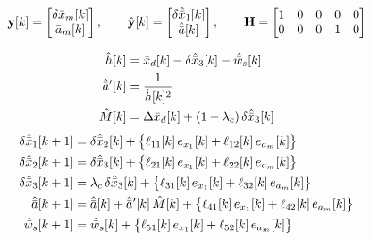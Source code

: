 \[
\mathbf{y}[k] = \begin{bmatrix} \delta\bar{x}_m[k] \\ \bar{a}_m[k] \end{bmatrix},
\qquad
\hat{\mathbf{y}}[k] = \begin{bmatrix} \delta\hat{\bar{x}}_1[k] \\ \hat{\bar{a}}[k] \end{bmatrix},
\qquad
\mathbf{H} =
\begin{bmatrix}
1 & 0 & 0 & 0 & 0 \\
0 & 0 & 0 & 1 & 0
\end{bmatrix}
\]

\[
\begin{aligned}
\hat{h}[k] &= \bar{x}_d[k] - \delta\hat{\bar{x}}_3[k] - \hat{\bar{w}}_s[k] \\
\hat{\bar{a}}'[k] &= \frac{1}{\hat{h}[k]^{2}} \\
\hat{M}[k] &= \Delta\bar{x}_d[k] + (1-\lambda_c)\,\delta\hat{\bar{x}}_3[k]
\end{aligned}
\]
\[
\begin{aligned}
\delta\hat{\bar{x}}_1[k+1] &= \delta\hat{\bar{x}}_2[k] + \big\{\ell_{11}[k]\,e_{x_1}[k] + \ell_{12}[k]\,e_{a_m}[k]\big\} \\
\delta\hat{\bar{x}}_2[k+1] &= \delta\hat{\bar{x}}_3[k] + \big\{\ell_{21}[k]\,e_{x_1}[k] + \ell_{22}[k]\,e_{a_m}[k]\big\} \\
\delta\hat{\bar{x}}_3[k+1] &= \lambda_c\,\delta\hat{\bar{x}}_3[k] + \big\{\ell_{31}[k]\,e_{x_1}[k] + \ell_{32}[k]\,e_{a_m}[k]\big\} \\
\hat{\bar{a}}[k+1] &= \hat{\bar{a}}[k] + \hat{\bar{a}}'[k]\,\hat{M}[k] + \big\{\ell_{41}[k]\,e_{x_1}[k] + \ell_{42}[k]\,e_{a_m}[k]\big\} \\
\hat{\bar{w}}_s[k+1] &= \hat{\bar{w}}_s[k] + \big\{\ell_{51}[k]\,e_{x_1}[k] + \ell_{52}[k]\,e_{a_m}[k]\big\}
\end{aligned}
\]


